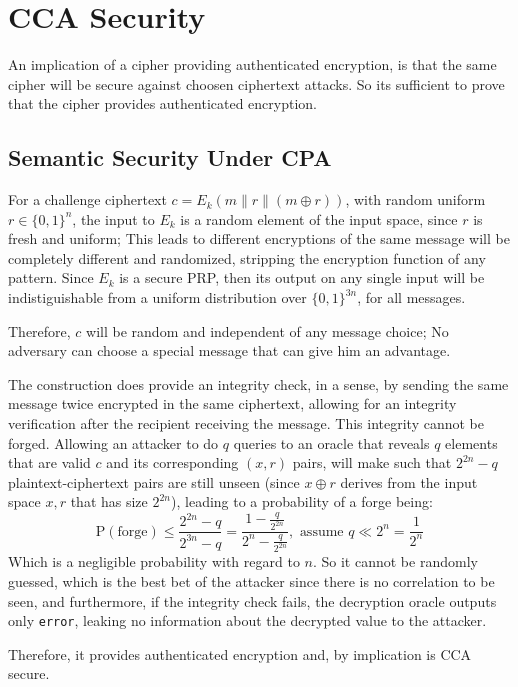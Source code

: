 \documentclass{article}
\begin{document}
\section{CCA Security}
An implication of a cipher providing authenticated encryption, is that the same cipher will be secure against choosen ciphertext attacks.
So its sufficient to prove that the cipher provides authenticated encryption.

\subsection{Semantic Security Under CPA}
For a challenge ciphertext $c = E_k (m \| r \| (m \oplus r))$, with random uniform $r \in \{0, 1\}^n$, the input to $E_k$ is a random element of the input space, since $r$ is fresh and uniform; This leads to different encryptions of the same message will be completely different and randomized, stripping the encryption function of any pattern.
Since $E_k$ is a secure PRP, then its output on any single input will be indistiguishable from a uniform distribution over $\{0, 1\}^{3n}$, for all messages.

Therefore, $c$ will be random and independent of any message choice; No adversary can choose a special message that can give him an advantage.

The construction does provide an integrity check, in a sense, by sending the same message twice encrypted in the same ciphertext, allowing for an integrity verification after the recipient receiving the message.
This integrity cannot be forged. Allowing an attacker to do $q$ queries to an oracle that reveals $q$ elements that are valid $c$ and its corresponding $(x, r)$ pairs, will make such that $2^{2n} - q$ plaintext-ciphertext pairs are still unseen (since $x\oplus r$ derives from the input space $x, r$ that has size $2^{2n}$), leading to a probability of a forge being:
\begin{equation}
    \text{P}(\text{forge}) \leq \frac{2^{2n}-q}{2^{3n} - q} = \frac{1 - \frac{q}{2^{2n}}}{2^{n} - \frac{q}{2^{2n}}},\text{ assume } q \ll 2^n = \frac{1}{2^n}
\end{equation}
Which is a negligible probability with regard to $n$. So it cannot be randomly guessed, which is the best bet of the attacker since there is no correlation to be seen, and furthermore, if the integrity check fails, the decryption oracle outputs only \texttt{error}, leaking no information about the decrypted value to the attacker.

Therefore, it provides authenticated encryption and, by implication is CCA secure.
\end{document}
